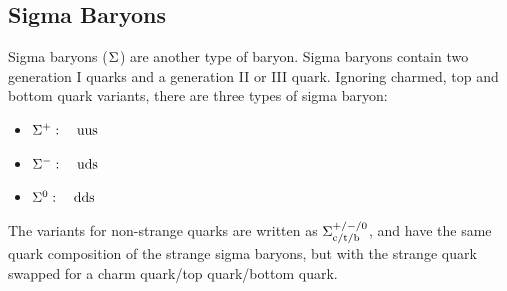         \subsection{Sigma Baryons}
            Sigma baryons ($\sigmabaryon$) are another type of baryon.
            Sigma baryons contain two generation I quarks and a generation II or III quark.
            Ignoring charmed, top and bottom quark variants, there are three types of sigma baryon:
            \begin{itemize}
                \item $\sigmabaryon[+]:\quad\baryonquarks[uus]$
                \item $\sigmabaryon[-]:\quad\baryonquarks[uds]$
                \item $\sigmabaryon[0]:\quad\baryonquarks[dds]$
            \end{itemize}
            The variants for non-strange quarks are written as $\sigmabaryon[+/-/0][\charmquark/\topquark/\bottomquark]$, and have the same quark composition of the strange sigma baryons, but with the strange quark swapped for a charm quark/top quark/bottom quark.
            

    \newpage